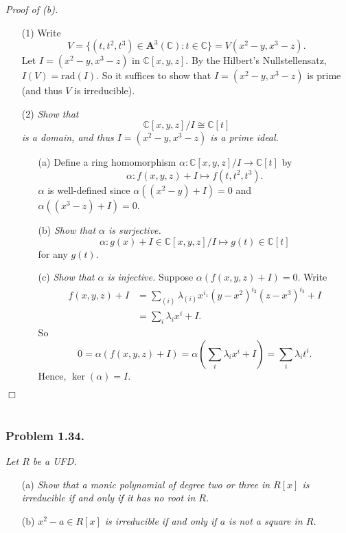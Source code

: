 \documentclass{article}
\begin{document}
\emph{Proof of (b).}
\begin{enumerate}
\item[(1)]
  Write
  \[
    V = \{ (t,t^2,t^3) \in \mathbf{A}^3(\mathbb{C}) : t \in \mathbb{C} \}
    =
    V(x^2-y, x^3-z).
  \]
  Let $I = (x^2-y, x^3-z)$ in $\mathbb{C}[x,y,z]$.
  By the Hilbert's Nullstellensatz,
  $I(V) = \mathrm{rad}(I)$.
  So it suffices to show that $I = (x^2-y, x^3-z)$ is prime
  (and thus $V$ is irreducible).

\item[(2)]
  \emph{Show that
  \[
    \mathbb{C}[x,y,z]/I \cong \mathbb{C}[t]
  \]
  is a domain, and thus $I = (x^2-y, x^3-z)$ is a prime ideal.}
  \begin{enumerate}
  \item[(a)]
    Define a ring homomorphism $\alpha: \mathbb{C}[x,y,z]/I \to \mathbb{C}[t]$
    by
    \[
      \alpha: f(x,y,z) + I \mapsto f(t,t^2,t^3).
    \]
    $\alpha$ is well-defined since $\alpha((x^2-y)+I) = 0$ and $\alpha((x^3-z)+I) = 0$.

  \item[(b)]
    \emph{Show that $\alpha$ is surjective.}
    \[
      \alpha: g(x) + I \in \mathbb{C}[x,y,z]/I \mapsto g(t) \in \mathbb{C}[t]
    \]
    for any $g(t)$.

  \item[(c)]
    \emph{Show that $\alpha$ is injective.}
    Suppose $\alpha(f(x,y,z) + I) = 0$.
    Write
    \begin{align*}
      f(x,y,z) + I
      &= \sum_{(i)} \lambda_{(i)} x^{i_1} (y-x^2)^{i_2} (z-x^3)^{i_3} + I \\
      &= \sum_{i} \lambda_{i} x^{i} + I.
    \end{align*}
    So
    \[
      0
      = \alpha(f(x,y,z)+I)
      = \alpha\left(\sum_{i} \lambda_{i} x^{i}+I\right)
      = \sum_{i} \lambda_{i} t^{i}.
    \]
    Hence, $\ker(\alpha) = I$.
  \end{enumerate}
\end{enumerate}
$\Box$ \\\\






\subsubsection*{Problem 1.34.}
\emph{Let $R$ be a UFD.}
\begin{enumerate}
\item[(a)]
  \emph{Show that a monic polynomial of degree two or three in $R[x]$ is irreducible
  if and only if it has no root in $R$.}

\item[(b)]
  \emph{$x^2-a \in R[x]$ is irreducible if and only if $a$ is not a square in $R$.} \\
\end{enumerate}
\end{document}
